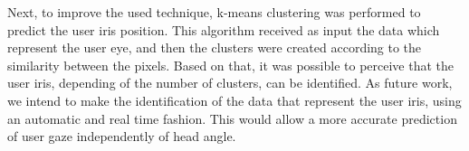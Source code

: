 \documentclass[10pt, conference]{IEEEtran}
\begin{document}
	Next, to improve the used technique, k-means clustering was performed to predict the user iris position. 
	This algorithm received as input the data which represent the user eye, and then the clusters were created according to the similarity between the pixels. 
	Based on that, it was possible to perceive that the user iris, depending of the number of clusters, can be identified.
	As future work, we intend to make the identification of the data that represent the user iris, using an automatic and real time fashion. 
	This would allow a more accurate prediction of user gaze independently of head angle.



\balance

\balance
\end{document}

